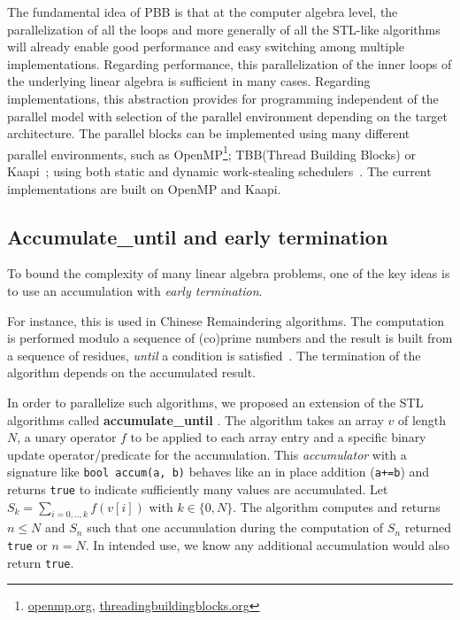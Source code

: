 \documentclass{article}
\newcommand{\accumulatewhile}{ \textbf{accumulate\_until} }
\newcommand{\Accumulatewhile}{ \textbf{Accumulate\_until} }
\begin{document}
  
  The fundamental idea of PBB is that at the computer algebra
  level, the parallelization of all the loops and more generally of all
  the STL-like algorithms will already enable good performance and
  easy switching among multiple implementations.
  Regarding performance, this parallelization of the inner loops of
  the underlying linear algebra is sufficient in many cases.
  Regarding implementations, this
  abstraction provides for programming independent of the
  parallel model with selection of the parallel environment
  depending on the target architecture.
  The parallel blocks can be implemented using many different parallel
  environments, such as
  OpenMP\footnote{\url{openmp.org}, \url{threadingbuildingblocks.org}}; 
  TBB\footnotemark[7] (Thread Building Blocks)
   or
  Kaapi~\cite{inproceedingsgautier.gbp_ktsrsf_07}; using
  both static and dynamic work-stealing
  schedulers~\cite{con-traore.trmgb_08}.
  The current implementations are built on OpenMP and Kaapi.

\subsection{\Accumulatewhile and early termination}
To bound the complexity of many linear algebra problems, one of the
key ideas is to use an accumulation with {\em early termination}.

For instance, this is used in Chinese Remaindering algorithms. The
computation is performed modulo a sequence of (co)prime numbers and
the result is built from a sequence of residues, {\em until} a
condition is satisfied~\cite{jgd:2010:crt}. 
The termination of the algorithm depends on the accumulated 
result.
  
In order to parallelize such algorithms, we proposed an extension of
the STL algorithms called \accumulatewhile.
The algorithm takes an array $v$ of length $N$, a unary
operator $f$ to be applied to each array entry and a specific binary
update operator/predicate for the accumulation.
This {\em accumulator} with a signature like \verb!bool accum(a, b)! behaves like an in place addition (\verb!a+=b!) and
returns \texttt{true} to indicate sufficiently many values are accumulated.
Let $S_k = \sum_{i=0,..,k} f( v[i])$ with 
$k \in \{0,N\}$.  The algorithm computes and returns $n \leq N$ and
$S_n$ such that one accumulation during the computation of $S_n$
returned \texttt{true} or $n = N$.  In intended use, we know any additional accumulation would also return \texttt{true}.
\end{document}
